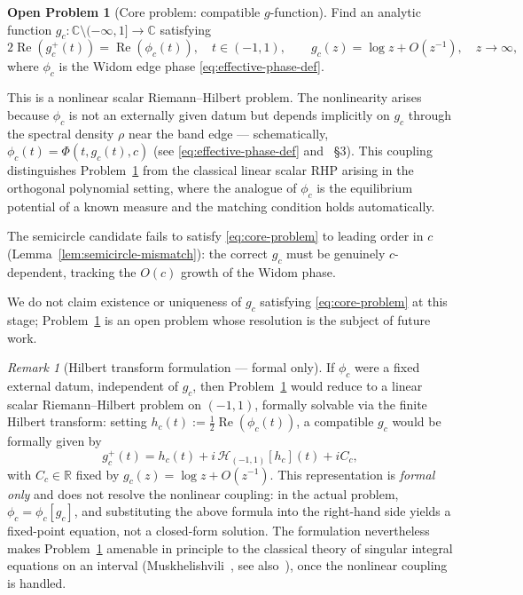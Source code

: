 \documentclass[12pt,a4paper]{amsart}
\theoremstyle{definition}
\newtheorem{problem}[theorem]{Open Problem}
\theoremstyle{remark}
\newtheorem{remark}[theorem]{Remark}
\begin{document}
\begin{problem}[Core problem: compatible $g$-function]
\label{prob:core}
Find an analytic function $g_c:\mathbb{C}\setminus(-\infty,1]\to\mathbb{C}$
satisfying
\begin{equation}\label{eq:core-problem}
  2\operatorname{Re}(g_c^+(t)) = \operatorname{Re}(\phi_c(t)),
  \quad t\in(-1,1), \qquad
  g_c(z) = \log z + O(z^{-1}), \quad z\to\infty,
\end{equation}
where $\phi_c$ is the Widom edge phase \eqref{eq:effective-phase-def}.

This is a nonlinear scalar Riemann--Hilbert problem.
The nonlinearity arises because $\phi_c$ is not an externally given
datum but depends implicitly on $g_c$ through the spectral density
$\rho$ near the band edge --- schematically,
$\phi_c(t) = \Phi(t, g_c(t), c)$
(see \eqref{eq:effective-phase-def} and~\cite{Widom1964} \S3).
This coupling distinguishes Problem~\ref{prob:core} from the classical
linear scalar RHP arising in the orthogonal polynomial setting, where
the analogue of $\phi_c$ is the equilibrium potential of a known
measure and the matching condition holds automatically.

The semicircle candidate fails to satisfy \eqref{eq:core-problem}
to leading order in $c$ (Lemma~\ref{lem:semicircle-mismatch}):
the correct $g_c$ must be genuinely $c$-dependent, tracking the
$O(c)$ growth of the Widom phase.

We do not claim existence or uniqueness of $g_c$ satisfying
\eqref{eq:core-problem} at this stage; Problem~\ref{prob:core}
is an open problem whose resolution is the subject of future work.
\end{problem}

\begin{remark}[Hilbert transform formulation --- formal only]
\label{rem:hilbert-formulation}
If $\phi_c$ were a fixed external datum, independent of $g_c$,
then Problem~\ref{prob:core} would reduce to a linear scalar
Riemann--Hilbert problem on $(-1,1)$, formally solvable via
the finite Hilbert transform:
setting $h_c(t) := \tfrac{1}{2}\operatorname{Re}(\phi_c(t))$,
a compatible $g_c$ would be formally given by
\[
  g_c^+(t) = h_c(t)
  + i\,\mathcal{H}_{(-1,1)}[h_c](t) + iC_c,
\]
with $C_c \in \mathbb{R}$ fixed by $g_c(z) = \log z + O(z^{-1})$.
This representation is \emph{formal only} and does not resolve
the nonlinear coupling: in the actual problem, $\phi_c = \phi_c[g_c]$,
and substituting the above formula into the right-hand side yields
a fixed-point equation, not a closed-form solution.
The formulation nevertheless makes Problem~\ref{prob:core} amenable
in principle to the classical theory of singular integral equations
on an interval (Muskhelishvili~\cite{Muskhelishvili1953},
see also~\cite{Deift1999}), once the nonlinear coupling is handled.
\end{remark}
\end{document}
